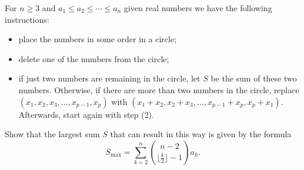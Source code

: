For $n \geq 3$ and $a_1 \leq a_2 \leq \cdots \leq a_n$ given real numbers we have the following instructions:
\begin{itemize}
\item[(1)] place the numbers in some order in a circle;
\item[(2)] delete one of the numbers from the circle;
\item[(3)] if just two numbers are remaining in the circle, let $S$ be the sum of these two numbers. Otherwise, if there are more than two numbers in the circle, replace $(x_1, x_2, x_3, \ldots, x_{p-1}, x_p)$ with $(x_1 + x_2, x_2 + x_3, \ldots, x_{p-1} + x_p, x_p + x_1)$. Afterwards, start again with step (2).
\end{itemize}
Show that the largest sum $S$ that can result in this way is given by the formula
\[ S_{\max} = \sum_{k=2}^{n} \binom{n-2}{\lfloor \frac{k}{2} \rfloor - 1} a_k. \]
